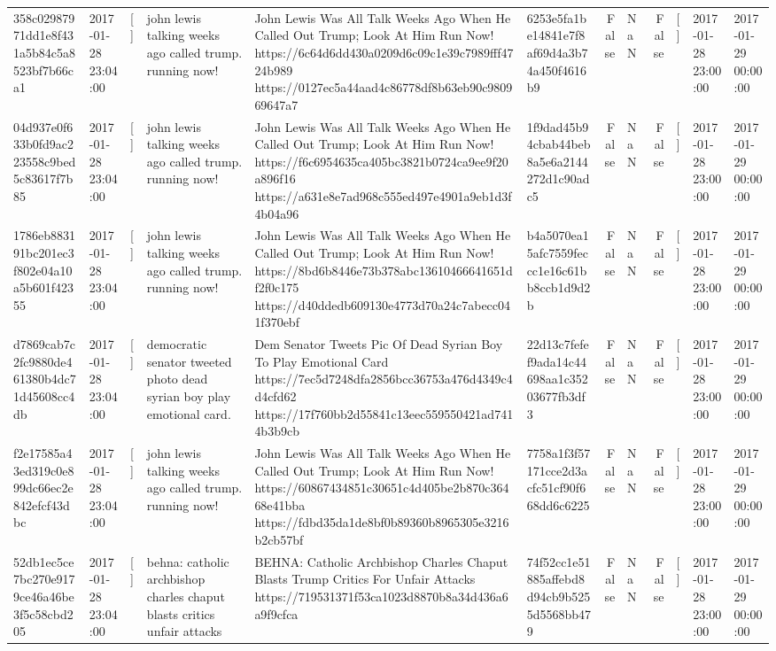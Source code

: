 \begin{tabular}{llllllrlrlll}
358c02987971dd1e8f431a5b84c5a8523bf7b66ca1 & 2017-01-28 23:04:00 & [] & john lewis talking weeks ago called trump. running now! & John Lewis Was All Talk Weeks Ago When He Called Out Trump; Look At Him Run Now! https://6c64d6dd430a0209d6c09c1e39c7989fff4724b989 https://0127ec5a44aad4c86778df8b63eb90c980969647a7 & 6253e5fa1be14841e7f8af69d4a3b74a450f4616b9 & False & NaN & False & [] & 2017-01-28 23:00:00 & 2017-01-29 00:00:00 \\
04d937e0f633b0fd9ac223558c9bed5c83617f7b85 & 2017-01-28 23:04:00 & [] & john lewis talking weeks ago called trump. running now! & John Lewis Was All Talk Weeks Ago When He Called Out Trump; Look At Him Run Now! https://f6c6954635ca405bc3821b0724ca9ee9f20a896f16 https://a631e8e7ad968c555ed497e4901a9eb1d3f4b04a96 & 1f9dad45b94cbab44beb8a5e6a2144272d1c90adc5 & False & NaN & False & [] & 2017-01-28 23:00:00 & 2017-01-29 00:00:00 \\
1786eb883191bc201ec3f802e04a10a5b601f42355 & 2017-01-28 23:04:00 & [] & john lewis talking weeks ago called trump. running now! & John Lewis Was All Talk Weeks Ago When He Called Out Trump; Look At Him Run Now! https://8bd6b8446e73b378abc13610466641651df2f0c175 https://d40ddedb609130e4773d70a24c7abecc041f370ebf & b4a5070ea15afc7559feccc1e16c61bb8ccb1d9d2b & False & NaN & False & [] & 2017-01-28 23:00:00 & 2017-01-29 00:00:00 \\
d7869cab7c2fc9880de461380b4dc71d45608cc4db & 2017-01-28 23:04:00 & [] & democratic senator tweeted photo dead syrian boy play emotional card. & Dem Senator Tweets Pic Of Dead Syrian Boy To Play Emotional Card https://7ec5d7248dfa2856bcc36753a476d4349c4d4cfd62 https://17f760bb2d55841c13eec559550421ad7414b3b9cb & 22d13c7fefef9ada14c44698aa1c35203677fb3df3 & False & NaN & False & [] & 2017-01-28 23:00:00 & 2017-01-29 00:00:00 \\
f2e17585a43ed319c0e899dc66ec2e842efcf43dbc & 2017-01-28 23:04:00 & [] & john lewis talking weeks ago called trump. running now! & John Lewis Was All Talk Weeks Ago When He Called Out Trump; Look At Him Run Now! https://60867434851c30651c4d405be2b870c36468e41bba https://fdbd35da1de8bf0b89360b8965305e3216b2cb57bf & 7758a1f3f57171cce2d3acfc51cf90f668dd6c6225 & False & NaN & False & [] & 2017-01-28 23:00:00 & 2017-01-29 00:00:00 \\
52db1ec5ce7bc270e9179ce46a46be3f5c58cbd205 & 2017-01-28 23:04:00 & [] & behna: catholic archbishop charles chaput blasts critics unfair attacks & BEHNA: Catholic Archbishop Charles Chaput Blasts Trump Critics For Unfair Attacks https://719531371f53ca1023d8870b8a34d436a6a9f9cfca & 74f52cc1e51885affebd8d94cb9b5255d5568bb479 & False & NaN & False & [] & 2017-01-28 23:00:00 & 2017-01-29 00:00:00 \\

\end{tabular}
